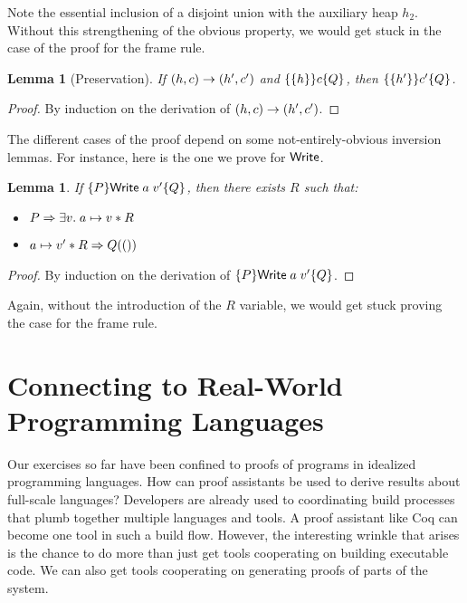 \documentclass{amsbook}
\newtheorem{lemma}[theorem]{Lemma}
\theoremstyle{definition}
\theoremstyle{remark}
\numberwithin{section}{chapter}
\numberwithin{equation}{chapter}
\begin{document}
Note the essential inclusion of a disjoint union with the auxiliary heap $h_2$.
Without this strengthening of the obvious property, we would get stuck in the case of the proof for the frame rule.

\begin{lemma}[Preservation]
  If $(h, c) \to (h', c')$ and $\{\{h\}\} c \{Q\}$, then $\{\{h'\}\} c' \{Q\}$.
\end{lemma}
\begin{proof}
  By induction on the derivation of $(h, c) \to (h', c')$.
\end{proof}

The different cases of the proof depend on some not-entirely-obvious inversion lemmas.
For instance, here is the one we prove for $\mathsf{Write}$.

\begin{lemma}
  If $\{P\} \mathsf{Write} \; a \; v' \{Q\}$, then there exists $R$ such that:
  \begin{itemize}
  \item $P \Rightarrow \exists v. \; a \mapsto v * R$
  \item $a \mapsto v' * R \Rightarrow Q(())$
  \end{itemize}
\end{lemma}
\begin{proof}
  By induction on the derivation of $\{P\} \mathsf{Write} \; a \; v' \{Q\}$.
\end{proof}

Again, without the introduction of the $R$ variable, we would get stuck proving the case for the frame rule.



\chapter{Connecting to Real-World Programming Languages}

Our exercises so far have been confined to proofs of programs in idealized programming languages.
How can proof assistants be used to derive results about full-scale languages?
Developers are already used to coordinating build processes that plumb together multiple languages and tools.
A proof assistant like Coq can become one tool in such a build flow.
However, the interesting wrinkle that arises is the chance to do more than just get tools cooperating on building executable code.
We can also get tools cooperating on generating proofs of parts of the system.
\end{document}
